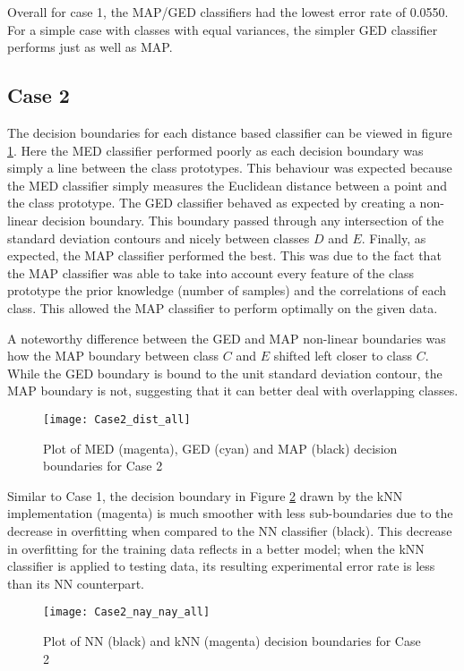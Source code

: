 \documentclass{article}
\begin{document}
Overall for case 1, the MAP/GED classifiers had the lowest error rate of 0.0550. For a simple case with classes with equal variances, the simpler GED classifier performs just as well as MAP.

\subsection{Case 2}
The decision boundaries for each distance based classifier can be viewed in figure \ref{fig:Case2_dist}. Here the MED classifier performed poorly as each decision boundary was simply a line between the class prototypes. This behaviour was expected because the MED classifier simply measures the Euclidean distance between a point and the class prototype. The GED classifier behaved as expected by creating a non-linear decision boundary. This boundary passed through any intersection of the standard deviation contours and nicely between classes $D$ and $E$. Finally, as expected, the MAP classifier performed the best. This was due to the fact that the MAP classifier was able to take into account every feature of the class prototype the prior knowledge (number of samples) and the correlations of each class. This allowed the MAP classifier to perform optimally on the given data.

A noteworthy difference between the GED and MAP non-linear boundaries was how the MAP boundary between class $C$ and $E$ shifted left closer to class $C$. While the GED boundary is bound to the unit standard deviation contour, the MAP boundary is not, suggesting that it can better deal with overlapping classes.

\begin{figure}[H]
    \caption{Plot of MED (magenta), GED (cyan) and MAP (black) decision boundaries for Case 2}
    \centering
    \texttt{[image: Case2\_dist\_all]}
    \label{fig:Case2_dist}
\end{figure}

Similar to Case 1, the decision boundary in Figure \ref{fig:Case2_nay_nay} drawn by the kNN implementation (magenta) is much smoother with less sub-boundaries due to the decrease in overfitting when compared to the NN classifier (black). This decrease in overfitting for the training data reflects in a better model; when the kNN classifier is applied to testing data, its resulting experimental error rate is less than its NN counterpart.

\begin{figure}[H]
    \caption{Plot of NN (black) and kNN (magenta) decision boundaries for Case 2}
    \centering
    \texttt{[image: Case2\_nay\_nay\_all]}
    \label{fig:Case2_nay_nay}
\end{figure}
\end{document}
